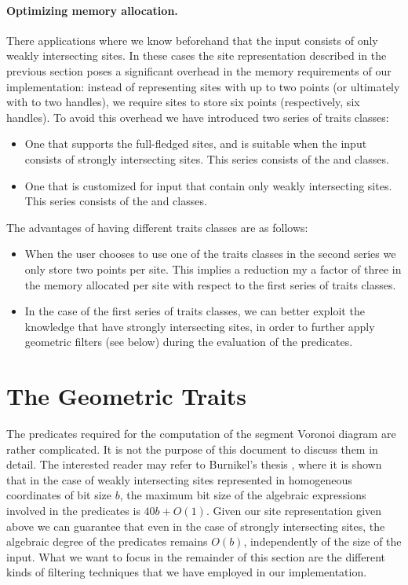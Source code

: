 \paragraph{Optimizing memory allocation.}
There applications where we know beforehand that the input consists of
only weakly intersecting sites. In these cases the site representation
described in the previous section poses a significant overhead in the
memory requirements of our implementation: instead of representing
sites with up to two points (or ultimately with to two handles), we
require sites to store six points (respectively, six handles). To
avoid this overhead we have introduced two series of traits classes:
\begin{itemize}
\item One that supports the full-fledged sites, and is suitable when
  the input consists of strongly intersecting sites. This series
  consists of the 
   and
  classes.
\item One that is customized for input that contain only weakly
  intersecting sites. This series consists of the
   and
  classes.
\end{itemize}
The advantages of having different traits classes are as follows:
\begin{itemize}
\item When the user chooses to use one of the traits classes in the
  second series we only store two points per site. This implies a
  reduction my a factor of three in the memory allocated per site with
  respect to the first series of traits classes.
\item In the case of the first series of traits classes, we can better
  exploit the knowledge that have strongly intersecting sites, in
  order to further apply geometric filters (see below) during the
  evaluation of the predicates.
\end{itemize}


\section{The Geometric Traits}
\label{sec:apollonius2-traits}

The predicates required for the computation of the segment Voronoi
diagram are rather complicated. It is not the purpose of this document to
discuss them in detail. The interested reader may refer to Burnikel's
thesis \cite{b-ecvdl-96}, where it is shown that in the case of weakly
intersecting sites represented in homogeneous coordinates of bit size
$b$, the maximum bit size of the algebraic expressions involved in the
predicates is $40b+O(1)$. Given our site representation given above we
can guarantee that even in the case of strongly intersecting sites,
the algebraic degree of the predicates remains $O(b)$, independently
of the size of the input. What we want to focus in the remainder of
this section are the different kinds of filtering techniques that we
have employed in our implementation.

